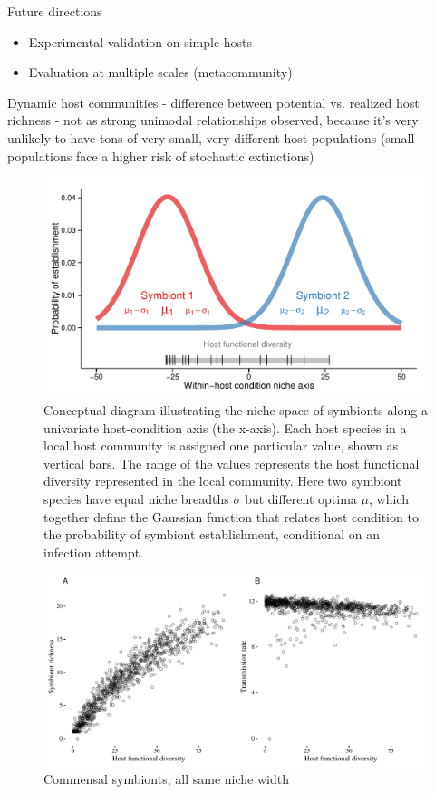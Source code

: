 \documentclass[12pt]{article}
\begin{document}
Future directions
\begin{itemize}
	\item Experimental validation on simple hosts
    \item Evaluation at multiple scales (metacommunity)
\end{itemize}

Dynamic host communities
- difference between potential vs. realized host richness
- not as strong unimodal relationships observed, because it's very unlikely to have tons of very small, very different host populations (small populations face a higher risk of stochastic extinctions)






\newpage

\begin{figure}[ht]\centering
\includegraphics[width=\linewidth]{fig/niche.pdf}
\caption{Conceptual diagram illustrating the niche space of symbionts along a univariate host-condition axis (the x-axis). Each host species in a local host community is assigned one particular value, shown as vertical bars. The range of the values represents the host functional diversity represented in the local community. Here two symbiont species have equal niche breadths $\sigma$ but different optima $\mu$, which together define the Gaussian function that relates host condition to the probability of symbiont establishment, conditional on an infection attempt.}
\label{fig:niche}
\end{figure}

\newpage

\begin{figure}[ht]\centering
\includegraphics[width=\linewidth]{fig/fig1.pdf}
\caption{Commensal symbionts, all same niche width}
\label{f2}
\end{figure}
\end{document}
